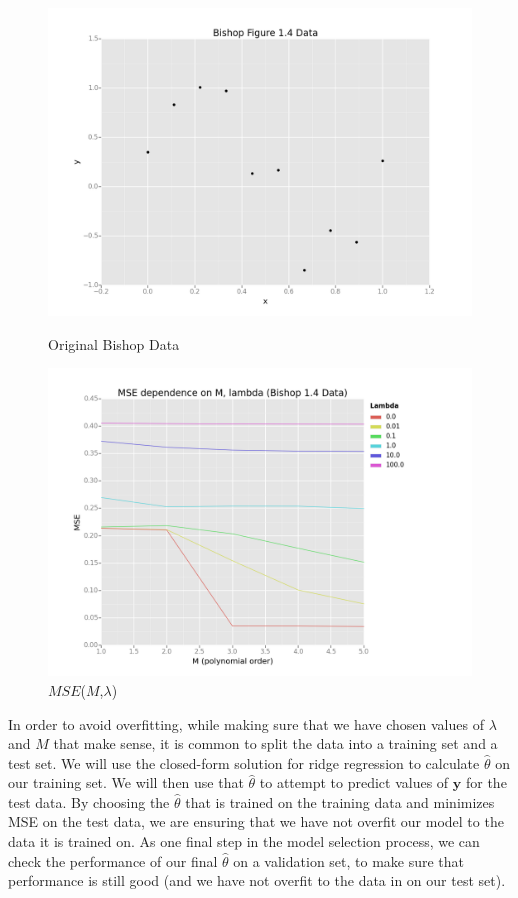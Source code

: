 \documentclass[10pt]{article}
\begin{document}
\begin{figure}[ht]
	\centering
	\begin{minipage}[b]{.48\linewidth}
                \includegraphics[width=1\linewidth]{Bishop_14_Data.png}
		\caption*{Original Bishop Data}
	\end{minipage}
	\begin{minipage}[b]{.48\linewidth}
                \includegraphics[width=1\linewidth]{MSE_Lambda_Bishop.png}
		\caption*{$MSE$($M$,$\lambda$)}
	\end{minipage}
\end{figure}

In order to avoid overfitting, while making sure that we have chosen values of $\lambda$ and $M$ that make sense, it is common to split the data into a training set and a test set. We will use the closed-form solution for ridge regression to calculate $\hat{\theta}$ on our training set. We will then use that $\hat{\theta}$ to attempt to predict values of $\mathbf{y}$ for the test data. By choosing the $\hat{\theta}$ that is trained on the training data and minimizes MSE on the test data, we are ensuring that we have not overfit our model to the data it is trained on. As one final step in the model selection process, we can check the performance of our final $\hat{\theta}$ on a validation set, to make sure that performance is still good (and we have not overfit to the data in on our test set).
\end{document}
